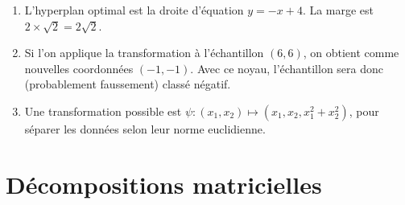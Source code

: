 \documentclass{article}
\begin{document}
\begin{enumerate}
\begin{tikzpicture}
	\end{tikzpicture}
	
	\item L'hyperplan optimal est la droite d'équation $y = -x + 4$. La marge est $2\times \sqrt{2} = 2\sqrt{2}$.
	
	\item Si l'on applique la transformation à l'échantillon $(6,6)$, on obtient comme nouvelles coordonnées $(-1,-1)$. Avec ce noyau, l'échantillon sera donc (probablement faussement) classé négatif.
	
	\item Une transformation possible est $\psi : (x_1,x_2) \mapsto (x_1,x_2,x_1^2+x_2^2)$, pour séparer les données selon leur norme euclidienne.
	
	
	\end{enumerate}
	
	
	\section{Décompositions matricielles}
	
\end{document}
